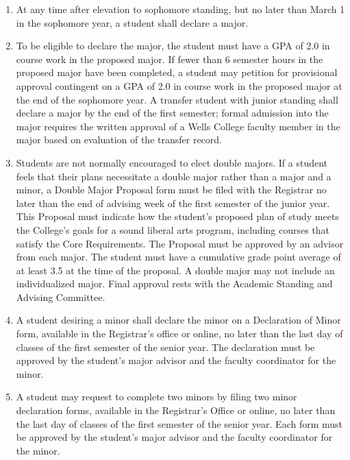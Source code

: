 \documentclass{manual}
\newcommand{\modified}[1]{}
\newcommand{\itemLevelA}{\alph*.}
\newcommand{\itemRefA}{\alph*}
\begin{document}
\begin{enumerate}[label=\itemLevelA,ref=\itemRefA]
\item At any time after elevation to sophomore standing, but no later than\modified{11/12/01} March 1 in the sophomore year, a student shall declare a major.

\item To be eligible to declare the major, the student must have a GPA of 2.0\modified{5/13/93} in course work in the proposed major. If fewer than 6 semester hours in the proposed major have been completed, a student may petition for provisional approval contingent on a GPA of 2.0 in course work in the proposed major at the end of the sophomore year. A transfer student with junior standing shall declare a major by the end of the first semester; formal admission into the major requires the written approval of a Wells College faculty member in the major based on evaluation of the transfer record.

\item Students are not normally encouraged to elect double majors. If a student \modified{10/17/00} feels that their plans necessitate a double major rather than a major and a minor,  a Double Major Proposal form must be filed with the Registrar no later than the \modified{9/9/2003}
end of advising week of the first semester of the junior year. This Proposal must indicate how the student's proposed plan of study meets the College's goals for a sound liberal arts program, including courses that satisfy the Core Requirements. The Proposal must be approved by an advisor from each major. The student must have a cumulative grade point average of at least 3.5 at the time of the proposal. A double major may not include an individualized major. Final approval rests with the Academic Standing and Advising Committee.

\item A student desiring a minor shall declare the minor on a Declaration of Minor\modified{4/8/03} form, available in the Registrar's office or online, no later than\modified{5/08/12} the last day of classes of the first semester of the senior year. The declaration must be approved by the student's major advisor and the faculty coordinator for the minor.

\item A student may request to complete two minors by filing two minor declaration forms, available in the Registrar's Office or online, no later than the last day of classes of the first semester of the senior year. Each form must be approved by the student's major advisor and the faculty coordinator for the minor.
\end{enumerate}
\end{document}
